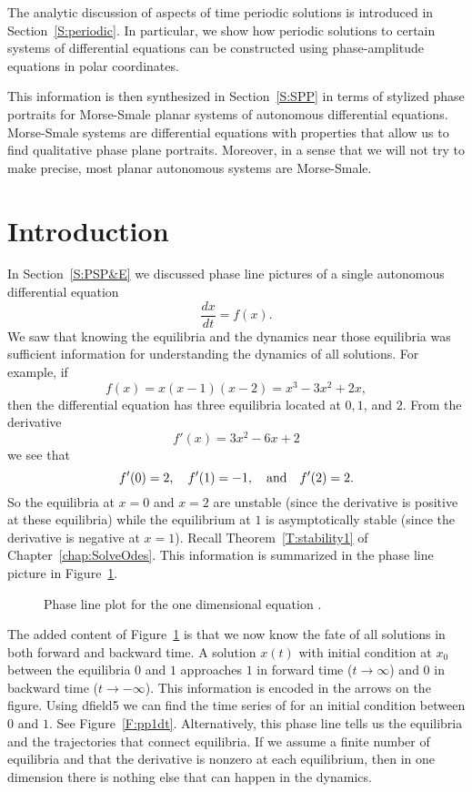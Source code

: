 \documentclass{ximera}
\begin{document}
The analytic discussion of aspects of time periodic solutions is introduced 
in Section~\ref{S:periodic}.  In particular, we show how 
periodic solutions to certain systems of differential equations can be 
constructed using phase-amplitude equations in polar coordinates.

This information is then synthesized in Section~\ref{S:SPP} in terms of 
stylized phase portraits for Morse-Smale planar systems of autonomous 
differential equations.  Morse-Smale systems are differential equations with 
properties that allow us to find qualitative phase plane portraits.  
Moreover, in a sense that we will not try to make precise, most planar 
autonomous systems are Morse-Smale.  


\section{Introduction}
\label{S:introAPNS}

In Section~\ref{S:PSP&E} we discussed phase line pictures of 
a single autonomous 
differential equation 
\[
\frac{dx}{dt} = f(x).
\]
We saw that knowing the equilibria and the dynamics 
near those equilibria was sufficient information for understanding 
the dynamics of all solutions.  For example, if 
\begin{equation}  \label{e:1dexample}
f(x) = x(x-1)(x-2)=x^3-3x^2+2x,
\end{equation}
then the differential equation has three equilibria located at 
$0,1$, and $2$.  From the derivative
\[
f'(x)=3x^2-6x+2
\]
we see that 
\[
f'(0)=2, \quad f'(1)=-1, \quad\mbox{and}\quad f'(2)=2.
\]
So the equilibria at $x=0$ and $x=2$ are unstable 
(since the derivative 
is positive at these equilibria) while the equilibrium at $1$ is 
asymptotically stable (since the derivative is negative at $x=1$). 
Recall Theorem~\ref{T:stability1} of Chapter~\ref{chap:SolveOdes}.  
This information is summarized in the phase line picture in 
Figure~\ref{F:pp1d}.

\begin{figure}[htb]
           \centerline{%
            }
           \caption{Phase line plot for the one dimensional equation
	\protect{}.}
           \label{F:pp1d}
\end{figure}

The added content of Figure~\ref{F:pp1d} is that we now know the 
fate of all solutions in both forward and backward time.  A 
solution $x(t)$ with initial condition at $x_0$ between the 
equilibria $0$ and $1$ approaches $1$ in forward time
($t\to\infty$) and $0$ in backward time ($t\to -\infty$).  
This information is 
encoded in the arrows on the figure.  Using {\sf dfield5}
 we can 
find the time series of  for an initial condition 
between $0$ and $1$.  See Figure~\ref{F:pp1dt}. Alternatively, this  
phase line tells us the equilibria and the trajectories that connect 
equilibria.  If we assume a finite number of equilibria and that the
derivative is nonzero at each equilibrium, then in one dimension 
there is nothing else that can happen in the dynamics.
\end{document}
